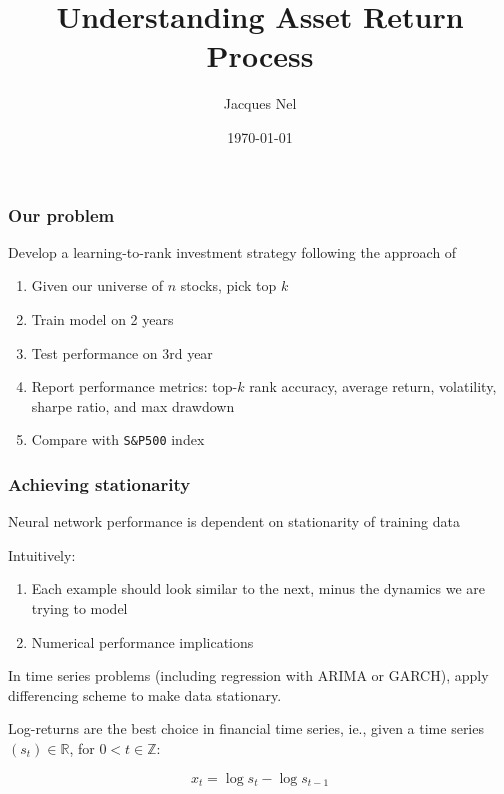 \documentclass{beamer}
\title{Understanding Asset Return Process}
\author{Jacques Nel}
\institute{York University}
\date{\today}
\newcommand{\Real}{\mathbb{R}}
\newcommand{\Int}{\mathbb{Z}}
\begin{document}
\begin{frame}
\titlepage
\end{frame}

\begin{frame}
    \frametitle{Our problem}

    Develop a learning-to-rank investment strategy following the approach of
    \citep{song:1}

    \begin{enumerate}

        \item Given our universe of $n$ stocks, pick top $k$

        \item Train model on 2 years

        \item Test performance on 3rd year

        \item Report performance metrics:
            top-$k$ rank accuracy, average return, volatility, sharpe ratio, and max drawdown

        \item Compare with \texttt{S\&P500} index

    \end{enumerate}

\end{frame}

\begin{frame}

\frametitle{Achieving stationarity}

Neural network performance is dependent on stationarity of training data

Intuitively:

\begin{enumerate}

    \item Each example should look similar to the next, minus the dynamics we are trying to model
    \item Numerical performance implications

\end{enumerate}

In time series problems (including regression with ARIMA or GARCH), apply differencing scheme
to make data stationary.

Log-returns are the best choice in financial time series, ie., given a time series
$(s_t) \in \Real$, for $0< t\in\Int$:

$$
x_t = \log s_t - \log s_{t-1}
$$

\end{frame}
\end{document}
